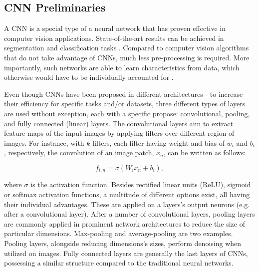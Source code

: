 \subsection{CNN Preliminaries}

A CNN is a special type of a neural network that has proven  effective in computer vision applications. State-of-the-art results can be achieved in segmentation and classification tasks \cite{a10}. Compared to computer vision algorithms that do not take advantage of CNNs, much less pre-processing is required. More importantly, such networks are able to learn characteristics from data, which otherwise would have to be individually accounted for \cite{a11}.

Even though CNNs have been proposed in different architectures - to increase their efficiency for specific tasks and/or datasets, three different types of layers are used without exception, each with a specific propose: convolutional, pooling, and fully connected (linear) layers. The convolutional layers aim to extract feature maps of the input images by applying filters over different region of images. For instance, with $k$ filters, each filter having weight and bias of $w_i$ and $b_i$, respectively, the convolution of an image patch, $x_n$, can be written as follows:

\begin{equation}
f_{i,n}=\sigma(W_ix_n+b_i),
\end{equation}

where $\sigma$ is the activation function. Besides rectified linear units (ReLU), sigmoid or softmax activation functions, a multitude of different options exist, all having their individual advantages. These are applied on a layers's output neurons (e.g. after a convolutional layer).
After a number of convolutional layers, pooling layers are commonly applied in prominent network architectures to reduce the size of particular dimensions. Max-pooling and average-pooling are two examples. Pooling layers, alongside reducing dimensions's sizes, perform denoising when utilized on images. 
Fully connected layers are generally the last layers of CNNs, possessing a similar structure compared to the traditional neural networks\cite{a12}.


